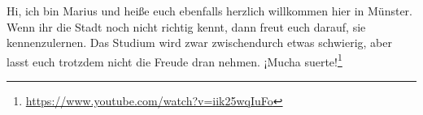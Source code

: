 \begin{multicols}{2}

{
Hi, ich bin Marius und heiße euch ebenfalls herzlich willkommen hier in Münster. Wenn ihr die Stadt noch nicht richtig kennt, dann freut euch darauf, sie kennenzulernen. 
Das Studium wird zwar zwischendurch etwas schwierig, aber lasst euch trotzdem nicht die Freude dran nehmen. ¡Mucha suerte!\footnote{\url{https://www.youtube.com/watch?v=iik25wqIuFo}}
}


\end{multicols}
